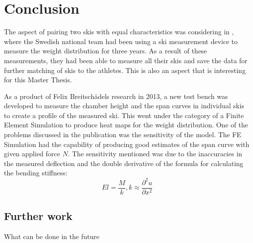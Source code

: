 \chapter{Conclusion}
The aspect of pairing two skis with equal characteristics was considering in \citep{backstrom_essential_2008}, where the Swedish national team had been using a ski measurement device to measure the weight distribution for three years. As a result of these measurements, they had been able to measure all their skis and save the data for further matching of skis to the athletes. This is also an aspect that is interesting for this Master Thesis.

As a product of Felix Breitschädels research in 2013, a new test bench was developed to measure the chamber height and the span curves in individual skis to create a profile of the measured ski. This went under the category of a Finite Element Simulation to produce heat maps for the weight distribution. One of the problems discussed in the publication was the sensitivity of the model. The FE Simulation had the capability of producing good estimates of the span curve with given applied force $N$. The sensitivity mentioned was due to the inaccuracies in the measured deflection and the double derivative of the formula for calculating the bending stiffness:
\begin{equation}
    El = \frac{M}{k} , k \approx \frac{\partial^2 u}{\partial x^2} 
\end{equation}

\section{Further work}
What can be done in the future